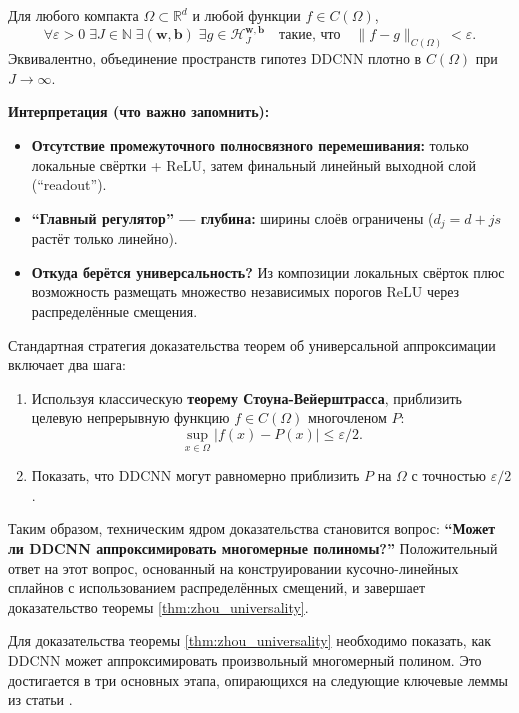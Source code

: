 \documentclass[../NDCNNAI_main.tex]{subfiles}
\begin{document}
\begin{theorem}
\label{thm:zhou_universality}
Для любого компакта $\Omega \subset \mathbb{R}^d$ и любой функции $f \in C(\Omega)$,
\[
\forall \varepsilon > 0 \; \exists J \in \mathbb{N} \; \exists (\mathbf{w}, \mathbf{b}) \; \exists g \in \mathcal{H}_{J}^{\mathbf{w},\mathbf{b}} \quad \text{такие, что} \quad \|f - g\|_{C(\Omega)} < \varepsilon.
\]
Эквивалентно, объединение пространств гипотез DDCNN плотно в $C(\Omega)$ при $J \to \infty$.
\end{theorem}

\textbf{Интерпретация (что важно запомнить):}
\begin{itemize}
    \item \textbf{Отсутствие промежуточного полносвязного перемешивания:} только локальные свёртки + ReLU, затем финальный линейный выходной слой (``readout'').
    \item \textbf{``Главный регулятор'' --- глубина:} ширины слоёв ограничены ($d_j = d + j s$ растёт только линейно).
    \item \textbf{Откуда берётся универсальность?} Из композиции локальных свёрток плюс возможность размещать множество независимых порогов ReLU через распределённые смещения.
\end{itemize}

Стандартная стратегия доказательства теорем об универсальной аппроксимации включает два шага:
\begin{enumerate}
    \item Используя классическую \textbf{теорему Стоуна-Вейерштрасса}, приблизить целевую непрерывную функцию $f \in C(\Omega)$ многочленом $P$:
    \[
    \sup_{x \in \Omega} |f(x) - P(x)| \leq \varepsilon/2.
    \]
    \item Показать, что DDCNN могут равномерно приблизить $P$ на $\Omega$ с точностью $\varepsilon/2$.
\end{enumerate}

Таким образом, техническим ядром доказательства становится вопрос: \textbf{``Может ли DDCNN аппроксимировать многомерные полиномы?''} Положительный ответ на этот вопрос, основанный на конструировании кусочно-линейных сплайнов с использованием распределённых смещений, и завершает доказательство теоремы \ref{thm:zhou_universality}.

Для доказательства теоремы \ref{thm:zhou_universality} необходимо показать, как DDCNN может аппроксимировать произвольный многомерный полином. Это достигается в три основных этапа, опирающихся на следующие ключевые леммы из статьи \cite{Zhou_Distributed}.
\end{document}
